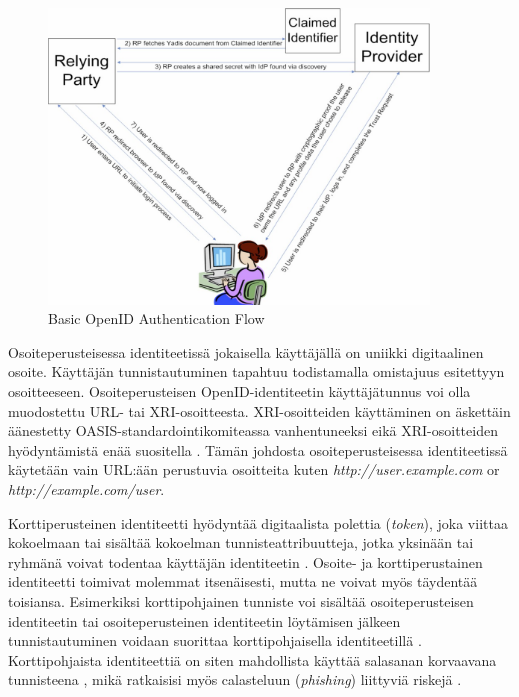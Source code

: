 \documentclass{tktltiki}
\begin{document}
      \begin{figure}
        \centering
        \includegraphics[width=0.9\textwidth]{images/openid_flow_recordon06.jpg}
        \caption{Basic OpenID Authentication Flow \cite{openid_2.0_platform_2009}}
        \label{fig:basic_openid_flow}
      \end{figure}

Osoiteperusteisessa identiteetissä jokaisella käyttäjällä on uniikki digitaalinen osoite. Käyttäjän tunnistautuminen tapahtuu todistamalla omistajuus esitettyyn osoitteeseen. Osoiteperusteisen OpenID-identiteetin käyttäjätunnus voi olla muodostettu URL- tai XRI-osoitteesta. XRI-osoitteiden käyttäminen on äskettäin äänestetty OASIS-standardointikomiteassa vanhentuneeksi eikä XRI-osoitteiden hyödyntämistä enää suositella \cite{xri_depcrecated_08a, xri_depcrecated_08b, xri_depcrecated_08c, xri_depcrecated_08d}. Tämän johdosta osoiteperusteisessa identiteetissä käytetään vain URL:ään perustuvia osoitteita kuten \emph{http://user.example.com} or \emph{http://example.com/user}.

Korttiperusteinen identiteetti hyödyntää digitaalista polettia (\emph{token}), joka viittaa kokoelmaan tai sisältää kokoelman tunnisteattribuutteja, jotka yksinään tai ryhmänä voivat todentaa käyttäjän identiteetin \cite{openid_2.0_platform_2009}. Osoite- ja korttiperustainen identiteetti toimivat molemmat itsenäisesti, mutta ne voivat myös täydentää toisiansa. Esimerkiksi korttipohjainen tunniste voi sisältää osoiteperusteisen identiteetin tai osoiteperusteinen identiteetin löytämisen jälkeen tunnistautuminen voidaan suorittaa korttipohjaisella identiteetillä \cite{openid_2.0_platform_2009}. Korttipohjaista identiteettiä on siten mahdollista käyttää salasanan korvaavana tunnisteena \cite{infocards_09}, mikä ratkaisisi myös calasteluun (\emph{phishing}) liittyviä riskejä \cite{cameron_infocard_07}. 
\end{document}
